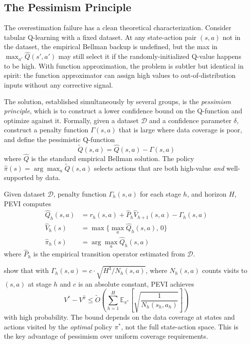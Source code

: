 \subsection{The Pessimism Principle}
\label{sec:pessimism}

The overestimation failure has a clean theoretical characterization. Consider tabular Q-learning with a fixed dataset. At any state-action pair $(s, a)$ not in the dataset, the empirical Bellman backup is undefined, but the max in $\max_{a'} \hat{Q}(s', a')$ may still select it if the randomly-initialized Q-value happens to be high. With function approximation, the problem is subtler but identical in spirit: the function approximator can assign high values to out-of-distribution inputs without any corrective signal.

The solution, established simultaneously by several groups, is the \textit{pessimism principle}, which is to construct a lower confidence bound on the Q-function and optimize against it. Formally, given a dataset $\mathcal{D}$ and a confidence parameter $\delta$, construct a penalty function $\Gamma(s, a)$ that is large where data coverage is poor, and define the pessimistic Q-function
\begin{equation}
\label{eq:pessimistic_q}
\tilde{Q}(s, a) = \hat{Q}(s, a) - \Gamma(s, a)
\end{equation}
where $\hat{Q}$ is the standard empirical Bellman solution. The policy $\hat{\pi}(s) = \arg\max_a \tilde{Q}(s, a)$ selects actions that are both high-value \textit{and} well-supported by data.

\begin{definition}
\label{def:pevi}
Given dataset $\mathcal{D}$, penalty function $\Gamma_h(s,a)$ for each stage $h$, and horizon $H$, PEVI computes
\begin{align}
\hat{Q}_h(s,a) &= r_h(s,a) + \hat{P}_h \hat{V}_{h+1}(s,a) - \Gamma_h(s,a) \\
\hat{V}_h(s) &= \max\{\max_a \hat{Q}_h(s,a), \, 0\} \\
\hat{\pi}_h(s) &= \arg\max_a \hat{Q}_h(s,a)
\end{align}
where $\hat{P}_h$ is the empirical transition operator estimated from $\mathcal{D}$.
\end{definition}

\citet{JinYang2021} show that with $\Gamma_h(s,a) = c \cdot \sqrt{H^3 / N_h(s,a)}$, where $N_h(s,a)$ counts visits to $(s,a)$ at stage $h$ and $c$ is an absolute constant, PEVI achieves
\begin{equation}
\label{eq:pevi_bound}
V^* - V^{\hat{\pi}} \leq \tilde{O}\left(\sum_{h=1}^H \mathbb{E}_{\pi^*}\left[\sqrt{\frac{1}{N_h(s_h, a_h)}}\right]\right)
\end{equation}
with high probability. The bound depends on the data coverage at states and actions visited by the \textit{optimal} policy $\pi^*$, not the full state-action space. This is the key advantage of pessimism over uniform coverage requirements.

